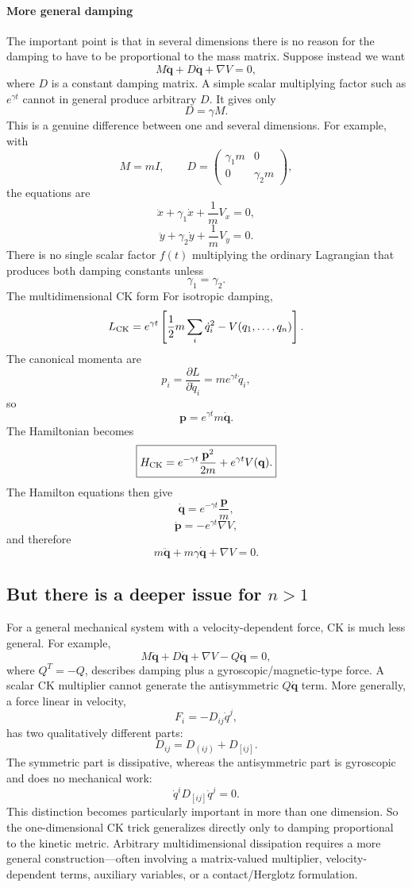 \paragraph{More general damping}
The important point is that in several dimensions there is no reason for the damping to have to be proportional to the mass matrix.
Suppose instead we want
$$ \boxed{ M\ddot{\mathbf q} +D\dot{\mathbf q} +\nabla V=0, } $$
where \(D\) is a constant damping matrix.
A simple scalar multiplying factor such as \(e^{\gamma t}\) cannot in general produce arbitrary \(D\). It gives only
$$ D=\gamma M. $$
This is a genuine difference between one and several dimensions.
For example, with
$$ M=mI,\qquad D= \begin{pmatrix} \gamma_1m&0\\ 0&\gamma_2m \end{pmatrix}, $$
the equations are
$$ \ddot x+\gamma_1\dot x+\frac1m V_x=0, $$ $$ \ddot y+\gamma_2\dot y+\frac1m V_y=0. $$
There is no single scalar factor \(f(t)\) multiplying the ordinary Lagrangian that produces both damping constants unless
$$ \gamma_1=\gamma_2. $$
The multidimensional CK form
For isotropic damping,
$$ L_{\rm CK} = e^{\gamma t} \left[ \frac12m\sum_i\dot q_i^2 - V(q_1,\ldots,q_n) \right]. $$
The canonical momenta are
$$ p_i = \frac{\partial L}{\partial\dot q_i} = m e^{\gamma t}\dot q_i, $$
so
$$ \boxed{ \mathbf p=e^{\gamma t}m\dot{\mathbf q}. } $$
The Hamiltonian becomes
$$ \boxed{ H_{\rm CK} = e^{-\gamma t}\frac{\mathbf p^2}{2m} + e^{\gamma t}V(\mathbf q). } $$
The Hamilton equations then give
$$ \dot{\mathbf q} = e^{-\gamma t}\frac{\mathbf p}{m}, $$ $$ \dot{\mathbf p} = -e^{\gamma t}\nabla V, $$
and therefore
$$ m\ddot{\mathbf q} +m\gamma\dot{\mathbf q} +\nabla V=0. $$

\subsection{But there is a deeper issue for \(n>1\)}

For a general mechanical system with a velocity-dependent force, CK is much less general.
For example,
$$ M\ddot{\mathbf q} +D\dot{\mathbf q} + \nabla V - Q\dot{\mathbf q}=0, $$
where \(Q^T=-Q\), describes damping plus a gyroscopic/magnetic-type force. A scalar CK multiplier cannot generate the antisymmetric \(Q\dot{\mathbf q}\) term.
More generally, a force linear in velocity,
$$ F_i=-D_{ij}\dot q^j, $$
has two qualitatively different parts:
$$ D_{ij}=D_{(ij)}+D_{[ij]}. $$
The symmetric part is dissipative, whereas the antisymmetric part is gyroscopic and does no mechanical work:
$$ \dot q^iD_{[ij]}\dot q^j=0. $$
This distinction becomes particularly important in more than one dimension.
So the one-dimensional CK trick generalizes directly only to damping proportional to the kinetic metric. Arbitrary multidimensional dissipation requires a more general construction—often involving a matrix-valued multiplier, velocity-dependent terms, auxiliary variables, or a contact/Herglotz formulation.

